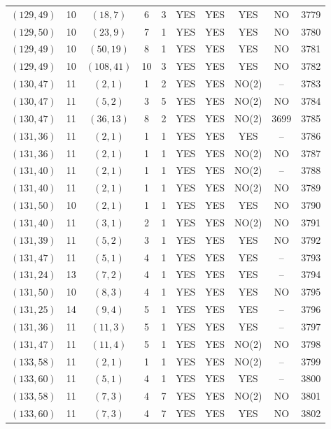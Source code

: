 \begin{longtable}{|c|c|c|c|c|c|c|c|c|c|}
$(129, 49)$ & 10 & $(18, 7)$ & 6 & 3 & YES & YES & YES & NO & 3779\\
$(129, 50)$ & 10 & $(23, 9)$ & 7 & 1 & YES & YES & YES & NO & 3780\\
$(129, 49)$ & 10 & $(50, 19)$ & 8 & 1 & YES & YES & YES & NO & 3781\\
$(129, 49)$ & 10 & $(108, 41)$ & 10 & 3 & YES & YES & YES & NO & 3782\\
$(130, 47)$ & 11 & $(2, 1)$ & 1 & 2 & YES & YES & NO(2) & -- & 3783\\
$(130, 47)$ & 11 & $(5, 2)$ & 3 & 5 & YES & YES & NO(2) & NO & 3784\\
$(130, 47)$ & 11 & $(36, 13)$ & 8 & 2 & YES & YES & NO(2) & 3699 & 3785\\
$(131, 36)$ & 11 & $(2, 1)$ & 1 & 1 & YES & YES & YES & -- & 3786\\
$(131, 36)$ & 11 & $(2, 1)$ & 1 & 1 & YES & YES & NO(2) & NO & 3787\\
$(131, 40)$ & 11 & $(2, 1)$ & 1 & 1 & YES & YES & NO(2) & -- & 3788\\
$(131, 40)$ & 11 & $(2, 1)$ & 1 & 1 & YES & YES & NO(2) & NO & 3789\\
$(131, 50)$ & 10 & $(2, 1)$ & 1 & 1 & YES & YES & YES & NO & 3790\\
$(131, 40)$ & 11 & $(3, 1)$ & 2 & 1 & YES & YES & NO(2) & NO & 3791\\
$(131, 39)$ & 11 & $(5, 2)$ & 3 & 1 & YES & YES & YES & NO & 3792\\
$(131, 47)$ & 11 & $(5, 1)$ & 4 & 1 & YES & YES & YES & -- & 3793\\
$(131, 24)$ & 13 & $(7, 2)$ & 4 & 1 & YES & YES & YES & -- & 3794\\
$(131, 50)$ & 10 & $(8, 3)$ & 4 & 1 & YES & YES & YES & NO & 3795\\
$(131, 25)$ & 14 & $(9, 4)$ & 5 & 1 & YES & YES & YES & -- & 3796\\
$(131, 36)$ & 11 & $(11, 3)$ & 5 & 1 & YES & YES & YES & -- & 3797\\
$(131, 47)$ & 11 & $(11, 4)$ & 5 & 1 & YES & YES & NO(2) & NO & 3798\\
$(133, 58)$ & 11 & $(2, 1)$ & 1 & 1 & YES & YES & NO(2) & -- & 3799\\
$(133, 60)$ & 11 & $(5, 1)$ & 4 & 1 & YES & YES & YES & -- & 3800\\
$(133, 58)$ & 11 & $(7, 3)$ & 4 & 7 & YES & YES & NO(2) & NO & 3801\\
$(133, 60)$ & 11 & $(7, 3)$ & 4 & 7 & YES & YES & YES & NO & 3802\\

\end{longtable}
